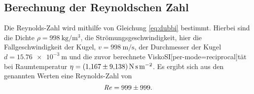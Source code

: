 \subsection{Berechnung der Reynoldschen Zahl}
Die Reynolds-Zahl wird mithilfe von Gleichung \eqref{eq:dubbi} bestimmt.
Hierbei sind die Dichte
\mbox{$\rho = \SI[per-mode=reciprocal]{998}{\kg\per\meter\cubed}$},
die Strömungsgeschwindigkeit, hier die Fallgeschwindigkeit der Kugel,
\mbox{$v = \SI[per-mode=reciprocal]{998}{\meter\per\second}$},
der Durchmesser der Kugel
\mbox{$d = \SI[per-mode=reciprocal]{15.76e-3}{\meter}$}
und die zuvor berechnete ViskoSI[per-mode=reciprocal]tät bei Raumtemperatur
\mbox{$\eta = \SI[per-mode=reciprocal]{1.167\pm9.138}{\newton\second\per\meter\squared}$}.
Es ergibt sich aus den genannten Werten eine Reynolds-Zahl von
\begin{equation}
    \mathit{R\kern-.04em e} = \num{999\pm999}.
\end{equation}
